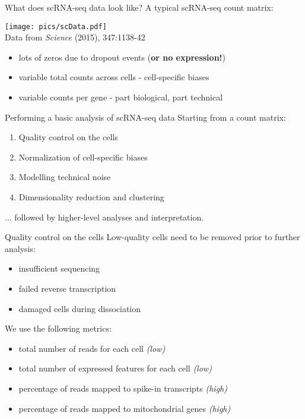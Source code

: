 \documentclass{beamer}
\begin{document}
\begin{frame}{What does scRNA-seq data look like?}
A typical scRNA-seq count matrix:
\begin{center}
    \texttt{[image: pics/scData.pdf]} \\
    \vspace{-.1in}
    {\tiny Data from \textit{Science} (2015), 347:1138-42}
\end{center}
\begin{itemize}
    \item lots of zeros due to dropout events (\textbf{or no expression!})
    \item variable total counts across cells - cell-specific biases
    \item variable counts per gene - part biological, part technical
\end{itemize}
\end{frame}

\begin{frame}{Performing a basic analysis of scRNA-seq data}
    Starting from a count matrix:\\[0.1em]
    \begin{enumerate}
        \setlength\itemsep{0.5em}
        \item Quality control on the cells
        \item Normalization of cell-specific biases
        \item Modelling technical noise 
        \item Dimensionality reduction and clustering
    \end{enumerate}
    ... followed by higher-level analyses and interpretation.
\end{frame}

\begin{frame}{Quality control on the cells}
    Low-quality cells need to be removed prior to further analysis:
    \begin{itemize}
        \item insufficient sequencing
        \item failed reverse transcription
        \item damaged cells during dissociation
    \end{itemize}
    \vspace{0.1in}
    We use the following metrics:
    \begin{itemize}
        \item total number of reads for each cell \textit{(low)}
        \item total number of expressed features for each cell \textit{(low)}
        \item percentage of reads mapped to spike-in transcripts \textit{(high)}
        \item percentage of reads mapped to mitochondrial genes \textit{(high)}
    \end{itemize}
\end{frame}
   
\end{document}
